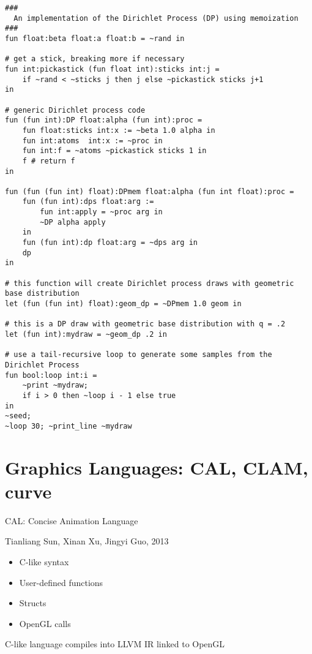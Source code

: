 \documentclass{plt}
\begin{document}
\begin{frame}[fragile]

\fontsize{5.5pt}{5.5pt}\selectfont

\begin{verbatim}
###
  An implementation of the Dirichlet Process (DP) using memoization
###
fun float:beta float:a float:b = ~rand in 

# get a stick, breaking more if necessary 
fun int:pickastick (fun float int):sticks int:j =
    if ~rand < ~sticks j then j else ~pickastick sticks j+1
in

# generic Dirichlet process code
fun (fun int):DP float:alpha (fun int):proc =
    fun float:sticks int:x := ~beta 1.0 alpha in
    fun int:atoms  int:x := ~proc in
    fun int:f = ~atoms ~pickastick sticks 1 in
    f # return f
in

fun (fun (fun int) float):DPmem float:alpha (fun int float):proc =
    fun (fun int):dps float:arg := 
        fun int:apply = ~proc arg in
        ~DP alpha apply 
    in
    fun (fun int):dp float:arg = ~dps arg in
    dp
in

# this function will create Dirichlet process draws with geometric base distribution
let (fun (fun int) float):geom_dp = ~DPmem 1.0 geom in
 
# this is a DP draw with geometric base distribution with q = .2
let (fun int):mydraw = ~geom_dp .2 in

# use a tail-recursive loop to generate some samples from the Dirichlet Process
fun bool:loop int:i =
    ~print ~mydraw;
    if i > 0 then ~loop i - 1 else true
in
~seed;
~loop 30; ~print_line ~mydraw
\end{verbatim}

\end{frame}

\section{Graphics Languages: CAL, CLAM, curve}

\begin{frame}{CAL: Concise Animation Language}

Tianliang Sun,
Xinan Xu,
Jingyi Guo, 2013

\begin{itemize}
\item C-like syntax
\item User-defined functions
\item Structs
\item OpenGL calls
\end{itemize}
 
C-like language compiles into LLVM IR linked to OpenGL

\end{frame}
\end{document}
